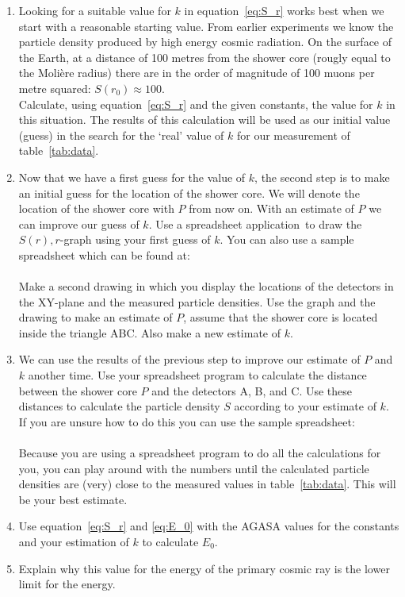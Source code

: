 \begin{shaded}
\begin{enumerate}[-]
\item Looking for a suitable value for $k$ in equation~\ref{eq:S_r} works best when we start with a reasonable starting value. From earlier experiments we know the particle density produced by high energy cosmic radiation. On the surface of the Earth, at a distance of 100 metres from the shower core (rougly equal to the Moli\`ere radius) there are in the order of magnitude of 100 muons per metre squared: $S(r_0)\approx 100$. \\ Calculate, using equation~\ref{eq:S_r} and the given constants, the value for $k$ in this situation. The results of this calculation will be used as our initial value (guess) in the search for the `real' value of $k$ for our measurement of table~\ref{tab:data}.
\item Now that we have a first guess for the value of $k$, the second step is to make an initial guess for the location of the shower core. We will denote the location of the shower core with $P$ from now on. With an estimate of $P$ we can improve our guess of $k$. Use a spreadsheet application\footnotemark ~to draw the $S(r),r$-graph using your first guess of $k$. You can also use a sample spreadsheet which can be found at:\\
 \\
Make a second drawing in which you display the locations of the detectors in the XY-plane and the measured particle densities. Use the graph and the drawing to make an estimate of $P$, assume that the shower core is located inside the triangle ABC. Also make a new estimate of $k$.
\item We can use the results of the previous step to improve our estimate of $P$ and $k$ another time. Use your spreadsheet program to calculate the distance between the shower core $P$ and the detectors A, B, and C. Use these distances to calculate the particle density $S$ according to your estimate of $k$. If you are unsure how to do this you can use the sample spreadsheet:\\
\\
Because you are using a spreadsheet program to do all the calculations for you, you can play around with the numbers until the calculated particle densities are (very) close to the measured values in table~\ref{tab:data}. This will be your best estimate.
\item Use equation~\ref{eq:S_r} and \ref{eq:E_0} with the AGASA values for the constants and your estimation of $k$ to calculate $ E_0$.
\item Explain why this value for the energy of the primary cosmic ray is the lower limit for the energy.
\end{enumerate}\end{shaded}

